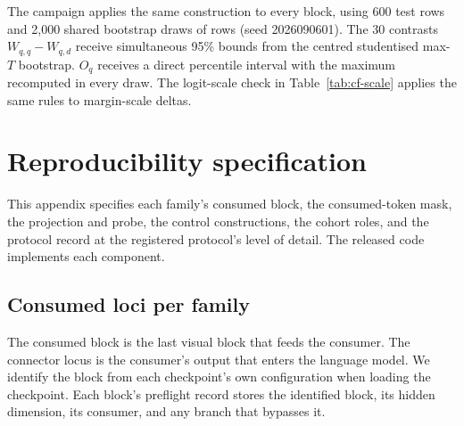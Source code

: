 \documentclass{article}
\begin{document}
The campaign applies the same construction to every block, using 600 test rows and 2{,}000 shared bootstrap draws of rows (seed 2026090601). The 30 contrasts $W_{q,q}-W_{q,d}$ receive simultaneous 95\% bounds from the centred studentised max-$T$ bootstrap. $O_q$ receives a direct percentile interval with the maximum recomputed in every draw. The logit-scale check in Table~\ref{tab:cf-scale} applies the same rules to margin-scale deltas.
\section{Reproducibility specification}
\label{app:repro}

This appendix specifies each family's consumed block, the consumed-token mask, the projection and probe, the control constructions, the cohort roles, and the protocol record at the registered protocol's level of detail. The released code implements each component.

\subsection{Consumed loci per family}
\label{app:repro-loci}

The consumed block is the last visual block that feeds the consumer. The connector locus is the consumer's output that enters the language model. We identify the block from each checkpoint's own configuration when loading the checkpoint. Each block's preflight record stores the identified block, its hidden dimension, its consumer, and any branch that bypasses it.
\end{document}
